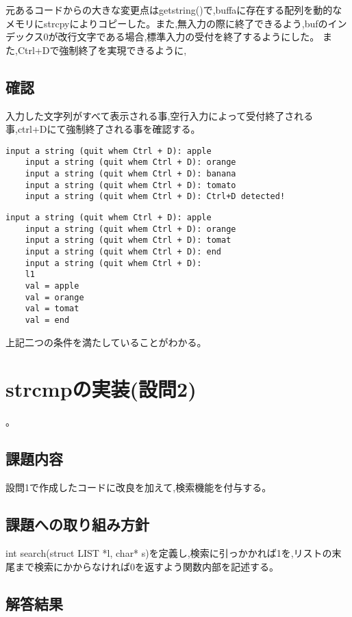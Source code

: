 \documentclass[fontsize = 10pt, paper= a4,twocolumn,column_gap=3zw]{jlreq}
\begin{document}
元あるコードからの大きな変更点はgetstring()で,buffaに存在する配列を動的なメモリにstrcpyによりコピーした。また,無入力の際に終了できるよう,bufのインデックス0が改行文字である場合,標準入力の受付を終了するようにした。
また,Ctrl+Dで強制終了を実現できるように,


\subsection{確認}
入力した文字列がすべて表示される事,空行入力によって受付終了される事,ctrl+Dにて強制終了される事を確認する。
\begin{lstlisting}[basicstyle=\ttfamily\footnotesize, frame=single, caption=test1,label=test1]
    input a string (quit whem Ctrl + D): apple
    input a string (quit whem Ctrl + D): orange
    input a string (quit whem Ctrl + D): banana
    input a string (quit whem Ctrl + D): tomato
    input a string (quit whem Ctrl + D): Ctrl+D detected!

\end{lstlisting}

\begin{lstlisting}[basicstyle=\ttfamily\footnotesize, frame=single, caption=test2,label=test2]
    input a string (quit whem Ctrl + D): apple
    input a string (quit whem Ctrl + D): orange
    input a string (quit whem Ctrl + D): tomat
    input a string (quit whem Ctrl + D): end
    input a string (quit whem Ctrl + D):
    l1
    val = apple
    val = orange
    val = tomat
    val = end    
\end{lstlisting}

上記二つの条件を満たしていることがわかる。

\section{strcmpの実装(設問2)}。
\subsection{課題内容}
設問1で作成したコードに改良を加えて,検索機能を付与する。
\subsection{課題への取り組み方針}
int search(struct LIST *l, char* s)を定義し,検索に引っかかれば1を,リストの末尾まで検索にかからなければ0を返すよう関数内部を記述する。
\subsection{解答結果}
\end{document}
